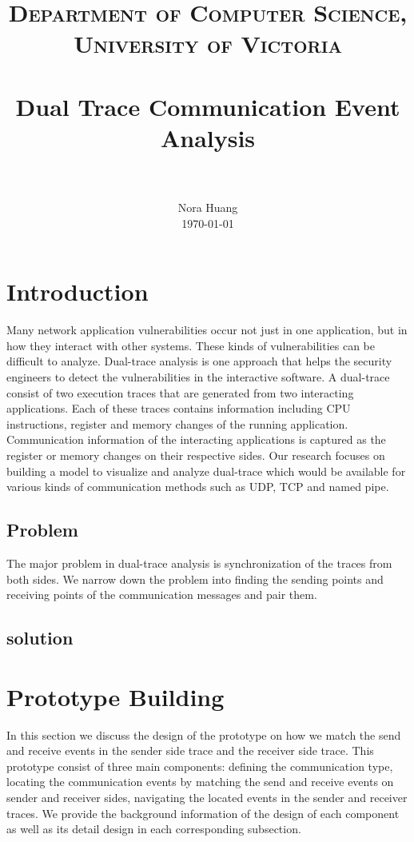 \documentclass[paper=a4, fontsize=11pt]{scrartcl}
\title{
		\usefont{OT1}{bch}{b}{n}
		\normalfont \normalsize \textsc{Department of Computer Science,  University of Victoria} \\ [25pt]
		\horrule{0.5pt} \\[0.4cm]
		\huge Dual Trace Communication Event Analysis  \\
		\horrule{2pt} \\[0.5cm]
}
\author{
		\normalfont 								\normalsize
        Nora Huang\\[-3pt]		\normalsize
        \today
}
\date{}
\numberwithin{equation}{section}		%
\numberwithin{figure}{section}			%
\numberwithin{table}{section}				%
\begin{document}
\maketitle

\section{Introduction}
Many network application vulnerabilities occur not just in one application, but in how they interact with other systems. These kinds of vulnerabilities can be difficult to analyze. Dual-trace analysis is one approach that helps the security engineers to detect the vulnerabilities in the interactive software. A dual-trace consist of two execution traces that are generated from two interacting applications. Each of these traces contains information including CPU instructions, register and memory changes of the running application. Communication information of the interacting applications is captured as the register or memory changes on their respective sides. Our research focuses on building a model to visualize and analyze dual-trace which would be available for various kinds of communication methods such as UDP, TCP and named pipe. 

\subsection{Problem}
The major problem in dual-trace analysis is synchronization of the traces from both sides. We narrow down the problem into finding the sending points and receiving points of the communication messages and pair them. 

\subsection{solution}

\section{Prototype Building}
In this section we discuss the design of the prototype on how we match the send and receive events in the sender side trace and the receiver side trace. This prototype consist of three main components: defining the communication type, locating the communication events by matching the send and receive events on sender and receiver sides, navigating the located events in the sender and receiver traces. We provide the background information of the design of each component as well as its detail design in each corresponding subsection.
\end{document}
